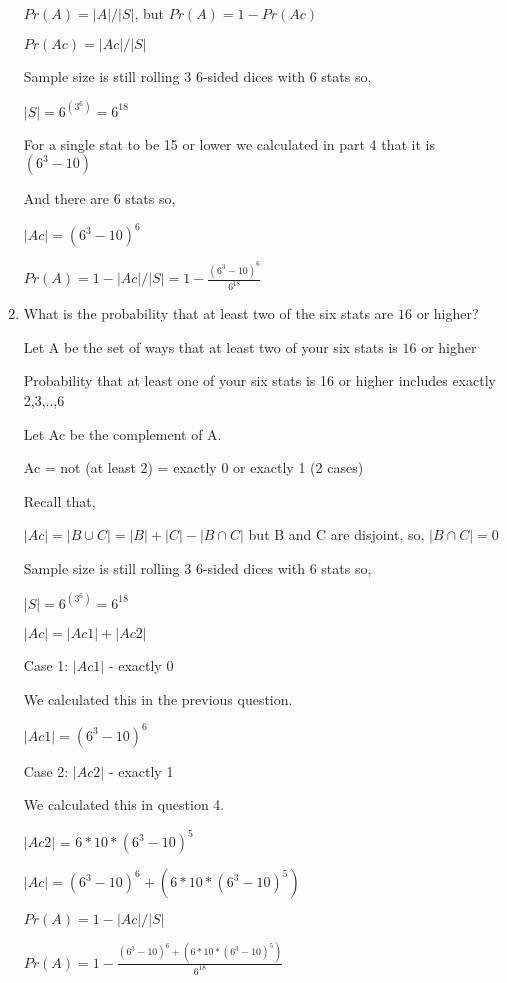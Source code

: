 \documentclass[12pt]{article}
\newcounter{ques}
\newenvironment{question}{\stepcounter{ques}{\noindent\bf Question \arabic{ques}:}}{\vspace{5mm}}
\begin{document}
\begin{question}
\begin{enumerate}
		$Pr(A) = |A|/|S|$, but $Pr(A) = 1 - Pr(Ac)$
		
		$Pr(Ac) = |Ac|/|S|$
		
		Sample size is still rolling 3 6-sided dices with 6 stats so, 

		$|S| = 6^{(3^6)} = 6^{18}$

		For a single stat to be 15 or lower we calculated in part 4 that it is $(6^3 - 10)$

		And there are 6 stats so,

		$|Ac| = (6^3 - 10)^6$

		$Pr(A) = 1 - |Ac|/|S| = 1 - \frac{(6^3 - 10)^6}{6^{18}}$


		
		\item What is the probability that at least two of the six stats are $16$ or higher?
		
		Let A be the set of ways that at least two of your six stats is $16$ or higher

		Probability that at least one of your six stats is 16 or higher includes exactly 2,3,..,6

		Let Ac be the complement of A.

		Ac = not (at least 2) = exactly 0 or exactly 1 (2 cases)

		Recall that,

		$|Ac| = |B \cup C| = |B| + |C| - |B \cap C|$ 
		but B and C are disjoint, so, 
		$|B \cap C| = 0$

		Sample size is still rolling 3 6-sided dices with 6 stats so, 

		$|S| = 6^{(3^6)} = 6^{18}$

		$|Ac| = |Ac1| + |Ac2|$

		Case 1: $|Ac1|$ - exactly 0

		We calculated this in the previous question.
		
		$|Ac1| = (6^3 - 10)^6$

		Case 2: $|Ac2|$ - exactly 1

		We calculated this in question 4.

		$|Ac2|$ = $6 * 10 * (6^3 - 10)^5$


		$|Ac| = (6^3 - 10)^6 + (6 * 10 * (6^3 - 10)^5)$

		$Pr(A) = 1 - |Ac|/|S|$

		$Pr(A) = 1 - \frac{(6^3 - 10)^6 + (6 * 10 * (6^3 - 10)^5)}{6^{18}}$

	
	\end{enumerate}
\end{question}
\end{document}
